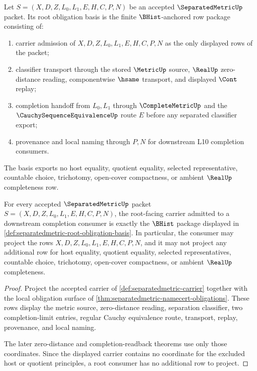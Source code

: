 \begin{definition}
\label{def:separatedmetric-root-obligation-basis}
Let $S=(X,D,Z,L_0,L_1,E,H,C,P,N)$ be an accepted $\SeparatedMetricUp$ packet. Its root obligation basis is the finite $\BHist$-anchored row package consisting of:
\begin{enumerate}
\item carrier admission of $X,D,Z,L_0,L_1,E,H,C,P,N$ as the only displayed rows of the packet;
\item classifier transport through the stored $\MetricUp$ source, $\RealUp$ zero-distance reading, componentwise $\hsame$ transport, and displayed $\Cont$ replay;
\item completion handoff from $L_0,L_1$ through $\CompleteMetricUp$ and the $\CauchySequenceEquivalenceUp$ route $E$ before any separated classifier export;
\item provenance and local naming through $P,N$ for downstream L10 completion consumers.
\end{enumerate}
The basis exports no host equality, quotient equality, selected representative, countable choice, trichotomy, open-cover compactness, or ambient $\RealUp$ completeness row.
\end{definition}

\begin{theorem}
\label{thm:separatedmetric-root-carrier-admission}
For every accepted $\SeparatedMetricUp$ packet $S=(X,D,Z,L_0,L_1,E,H,C,P,N)$, the root-facing carrier admitted to a downstream completion consumer is exactly the $\BHist$ package displayed in \autoref{def:separatedmetric-root-obligation-basis}. In particular, the consumer may project the rows $X,D,Z,L_0,L_1,E,H,C,P,N$, and it may not project any additional row for host equality, quotient equality, selected representatives, countable choice, trichotomy, open-cover compactness, or ambient $\RealUp$ completeness.
\end{theorem}
\begin{proof}
Project the accepted carrier of \autoref{def:separatedmetric-carrier} together with the local obligation surface of \autoref{thm:separatedmetric-namecert-obligations}. These rows display the metric source, zero-distance reading, separation classifier, two completion-limit entries, regular Cauchy equivalence route, transport, replay, provenance, and local naming.

The later zero-distance and completion-readback theorems use only those coordinates. Since the displayed carrier contains no coordinate for the excluded host or quotient principles, a root consumer has no additional row to project.
\end{proof}


